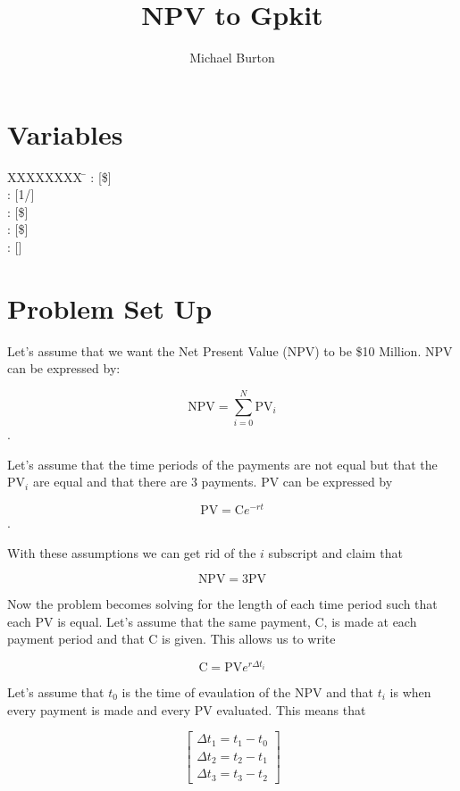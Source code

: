 \documentclass[10pt, a4paper]{article}
\begin{document}
\title{NPV to Gpkit}
\author{Michael Burton}
\maketitle

\section*{Variables}

\begin{tabbing}
  XXXXXXXX \= \kill%
 : [\$]  \\
: [1/]   \\
: [\$]  \\
: [\$]  \\
: [] 
\end{tabbing}

\section*{Problem Set Up}

Let's assume that we want the Net Present Value (NPV) to be \$10 Million.  NPV can be expressed by:

\[ \text{NPV} = \displaystyle\sum\limits_{i=0}^N \text{PV}_i \] .

Let's assume that the time periods of the payments are not equal but that the PV$_{i}$ are equal and that there are 3 payments.  PV can be expressed by

\[\text{PV} = \text{C} e^{-rt} \].

With these assumptions we can get rid of the $i$ subscript and claim that

\[\text{NPV} = 3\text{PV} \]

Now the problem becomes solving for the length of each time period such that each PV is equal.  Let's assume that the same payment, C, is made at each payment period and that C is given.  This allows us to write 

\[ \text{C}  = \text{PV}e^{r \Delta t_i} \]

Let's assume that $t_0$ is the time of evaulation of the NPV and that $t_i$ is when every payment is made and every PV evaluated. This means that

\[ \begin{bmatrix} \Delta t_1 = t_1 - t_0 \\
\Delta t_2 = t_2 - t_1 \\
\Delta t_3 = t_3 - t_2 
\end{bmatrix} \]
\end{document}
